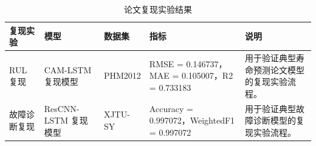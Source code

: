 \begin{table}[H]
\centering
\caption{论文复现实验结果}
\label{tab:paper-reproduction-results}
\small
\begin{tabularx}{\textwidth}{p{3.0cm}p{3.2cm}p{2.8cm}p{3.2cm}Y}
\toprule
复现实验 & 模型 & 数据集 & 指标 & 说明 \\
\midrule
RUL 复现 & CAM-LSTM 复现模型 & PHM2012 & RMSE = 0.146737，MAE = 0.105007，R2 = 0.733183 & 用于验证典型寿命预测论文模型的复现实验流程。 \\
故障诊断复现 & ResCNN-LSTM 复现模型 & XJTU-SY & Accuracy = 0.997072，WeightedF1 = 0.997072 & 用于验证典型故障诊断模型的复现实验流程。 \\
\bottomrule
\end{tabularx}
\end{table}
